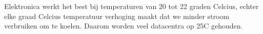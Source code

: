 Elektronica werkt het best bij temperaturen van 20 tot 22 graden Celcius, echter elke graad Celcius temperatuur verhoging maakt dat we minder stroom verbruiken om te koelen. Daarom worden veel datacentra op 25\textdegree C gehouden.

